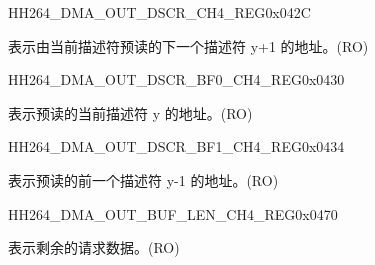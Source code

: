 \begin{register}{H}{H264\_DMA\_OUT\_DSCR\_CH4\_REG}{0x042C}\label{regdesc:H264DMAOUTDSCRCH4REG}
%
\regnewline%
\begin{regdesc}\begin{reglist}
\label{fielddesc:H264DMAOUTLINKDSCRCH4}\item [H264\_DMA\_OUTLINK\_DSCR\_CH4] 表示由当前描述符预读的下一个描述符 y+1 的地址。(RO)
\end{reglist}\end{regdesc}
\end{register}


\begin{register}{H}{H264\_DMA\_OUT\_DSCR\_BF0\_CH4\_REG}{0x0430}\label{regdesc:H264DMAOUTDSCRBF0CH4REG}
%
\regnewline%
\begin{regdesc}\begin{reglist}
\label{fielddesc:H264DMAOUTLINKDSCRBF0CH4}\item [H264\_DMA\_OUTLINK\_DSCR\_BF0\_CH4] 表示预读的当前描述符 y 的地址。(RO)
\end{reglist}\end{regdesc}
\end{register}


\begin{register}{H}{H264\_DMA\_OUT\_DSCR\_BF1\_CH4\_REG}{0x0434}\label{regdesc:H264DMAOUTDSCRBF1CH4REG}
%
\regnewline%
\begin{regdesc}\begin{reglist}
\label{fielddesc:H264DMAOUTLINKDSCRBF1CH4}\item [H264\_DMA\_OUTLINK\_DSCR\_BF1\_CH4] 表示预读的前一个描述符 y-1 的地址。(RO)
\end{reglist}\end{regdesc}
\end{register}

\begin{register}{H}{H264\_DMA\_OUT\_BUF\_LEN\_CH4\_REG}{0x0470}\label{regdesc:H264DMAOUTBUFLENCH4REG}
%
%
\regnewline%
\begin{regdesc}\begin{reglist}
\label{fielddesc:H264DMAOUTCMDFIFOBUFLENHBCH4}\item [H264\_DMA\_OUT\_CMDFIFO\_BUF\_LEN\_HB\_CH4] 表示剩余的请求数据。(RO)
\end{reglist}\end{regdesc}
\end{register}


